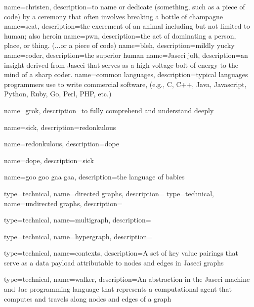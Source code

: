{
    name=christen,
    description={to name or dedicate (something, such as a piece of code) by a ceremony that often involves breaking a bottle of champagne}
}
{
    name=scat,
    description={the excrement of an animal including but not limited to human; also heroin }
}
{
    name=pwn,
    description={the act of dominating a person, place, or thing. (...or a piece of code)}
}
{
    name=bleh,
    description={mildly yucky}
}
{
    name=coder,
    description={the superior human}
}
{
    name=Jaseci jolt,
    description={an insight derived from Jaseci that serves as a high voltage bolt of energy to the mind of a sharp coder.}
}
{
    name=common languages,
    description={typical languages programmers use to write commercial software, (e.g., C, C++, Java, Javascript, Python, Ruby, Go, Perl, PHP, etc.)}
}

{
    name=grok,
    description={to fully comprehend and understand deeply }
}

{
    name=sick,
    description={\gls{redonkulous}}
}

{
    name=redonkulous,
    description={\gls{dope}}
}

{
    name=dope,
    description={\gls{sick}}
}

{
    name=goo goo gaa gaa,
    description={the language of babies}
}

{
    type=technical,
    name=directed graphs,
    description={}
}
{
    type=technical,
    name=undirected graphs,
    description={}
}

{
    type=technical,
    name=multigraph,
    description={}
}

{
    type=technical,
    name=hypergraph,
    description={}
}

{
    type=technical,
    name=contexts,
    description={A set of key value pairings that serve as a data payload attributable to nodes and edges in Jaseci graphs}
}

{
    type=technical,
    name=walker,
    description={An abstraction in the Jaseci machine and Jac programming language that represents a computational agent that computes and travels along nodes and edges of a graph}
}

